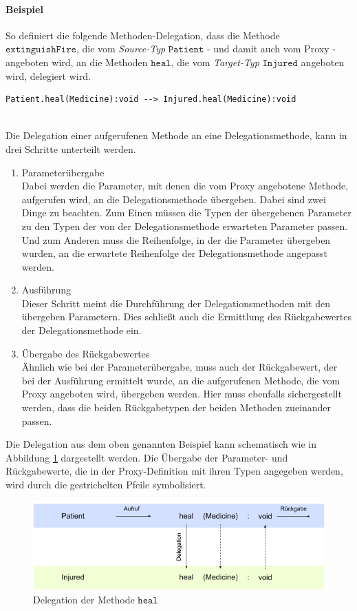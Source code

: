 \documentclass[a4paper,12pt]{article}
\begin{document}
\paragraph{Beispiel} So definiert die folgende Methoden-Delegation, dass die Methode $\texttt{extinguishFire}$, die vom \emph{Source-Typ} $\texttt{Patient}$ - und damit auch vom Proxy - angeboten wird, an die Methoden $\texttt{heal}$, die vom \emph{Target-Typ} $\texttt{Injured}$ angeboten wird, delegiert wird.
\begin{lstlisting}[style = dsl]
	Patient.heal(Medicine):void --> Injured.heal(Medicine):void
\end{lstlisting}
\noindent\\
Die Delegation einer aufgerufenen Methode an eine Delegationsmethode, kann in drei Schritte unterteilt werden.
\begin{enumerate}
\item Parameterübergabe\\
Dabei werden die Parameter, mit denen die vom Proxy angebotene Methode, aufgerufen wird, an die Delegationsmethode übergeben. Dabei sind zwei Dinge zu beachten. Zum Einen müssen die Typen der übergebenen Parameter zu den Typen der von der Delegationsmethode erwarteten Parameter passen. Und zum Anderen muss die Reihenfolge, in der die Parameter übergeben wurden, an die erwartete Reihenfolge der Delegationsmethode angepasst werden.
\item Ausführung\\
Dieser Schritt meint die Durchführung der Delegationsmethoden mit den übergeben Parametern. Dies schließt auch die Ermittlung des Rückgabewertes der Delegationsmethode ein.
\item Übergabe des Rückgabewertes\\
Ähnlich wie bei der Parameterübergabe, muss auch der Rückgabewert, der bei der Ausführung ermittelt wurde, an die aufgerufenen Methode, die vom Proxy angeboten wird, übergeben werden. Hier muss ebenfalls sichergestellt werden, dass die beiden Rückgabetypen der beiden Methoden zueinander passen.
\end{enumerate}
Die Delegation aus dem oben genannten Beispiel kann schematisch wie in Abbildung \ref{fig:DEL_heal} dargestellt werden. Die Übergabe der Parameter- und Rückgabewerte, die in der Proxy-Definition mit ihren Typen angegeben werden, wird durch die gestrichelten Pfeile symbolisiert.
\begin{figure}[H]
\includegraphics[width=\linewidth]{MDEL_heal}
\caption{Delegation der Methode $\texttt{heal}$}
\label{fig:DEL_heal}
\end{figure}
\end{document}
